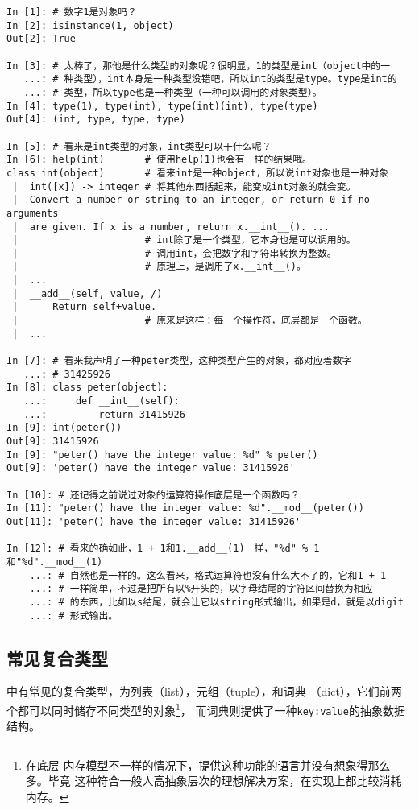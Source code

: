 \begin{lstlisting}
In [1]: # 数字1是对象吗？
In [2]: isinstance(1, object)
Out[2]: True

In [3]: # 太棒了，那他是什么类型的对象呢？很明显，1的类型是int（object中的一
   ...: # 种类型），int本身是一种类型没错吧，所以int的类型是type。type是int的
   ...: # 类型，所以type也是一种类型（一种可以调用的对象类型）。
In [4]: type(1), type(int), type(int)(int), type(type)
Out[4]: (int, type, type, type)

In [5]: # 看来是int类型的对象，int类型可以干什么呢？
In [6]: help(int)       # 使用help(1)也会有一样的结果哦。
class int(object)       # 看来int是一种object，所以说int对象也是一种对象
 |  int([x]) -> integer # 将其他东西括起来，能变成int对象的就会变。
 |  Convert a number or string to an integer, or return 0 if no arguments
 |  are given. If x is a number, return x.__int__(). ...
 |                      # int除了是一个类型，它本身也是可以调用的。
 |                      # 调用int，会把数字和字符串转换为整数。
 |                      # 原理上，是调用了x.__int__()。
 |  ...
 |  __add__(self, value, /)
 |      Return self+value.
 |                      # 原来是这样：每一个操作符，底层都是一个函数。
 |  ...

In [7]: # 看来我声明了一种peter类型，这种类型产生的对象，都对应着数字
   ...: # 31425926
In [8]: class peter(object):
   ...:     def __int__(self):
   ...:         return 31415926
In [9]: int(peter())
Out[9]: 31415926
In [9]: "peter() have the integer value: %d" % peter()
Out[9]: 'peter() have the integer value: 31415926'

In [10]: # 还记得之前说过对象的运算符操作底层是一个函数吗？
In [11]: "peter() have the integer value: %d".__mod__(peter())
Out[11]: 'peter() have the integer value: 31415926'

In [12]: # 看来的确如此，1 + 1和1.__add__(1)一样，"%d" % 1和"%d".__mod__(1)
    ...: # 自然也是一样的。这么看来，格式运算符也没有什么大不了的，它和1 + 1
    ...: # 一样简单，不过是把所有以%开头的，以字母结尾的字符区间替换为相应
    ...: # 的东西，比如以s结尾，就会让它以string形式输出，如果是d，就是以digit
    ...: # 形式输出。
\end{lstlisting}

\subsection{常见复合类型}

\pyth 中有常见的复合类型，为列表（list），元组（tuple），和词典
（dict），它们前两个都可以同时储存不同类型的对象\footnote{在底层
内存模型不一样的情况下，提供这种功能的语言并没有想象得那么多。毕竟
这种符合一般人高抽象层次的理想解决方案，在实现上都比较消耗内存。}，
而词典则提供了一种\verb|key:value|的抽象数据结构。

